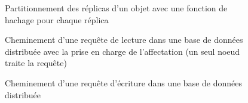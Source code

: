 \documentclass[12pt]{article}
\begin{document}
\begin{figure}[p]
	\centering
		
	\caption{Partitionnement des réplicas d'un objet avec une fonction de hachage pour chaque réplica\label{fig:multi_hash_partitionning}}
\end{figure}

\begin{figure}
	\centering
		
	\caption{Cheminement d'une requête de lecture dans une base de données distribuée avec la prise en charge de l'affectation (un seul noeud traite la requête)\label{fig:request}}
\end{figure}

\begin{figure}
	\centering
		
	\caption{Cheminement d'une requête d'écriture dans une base de données distribuée\label{fig:write_request}}
\end{figure}
\end{document}
